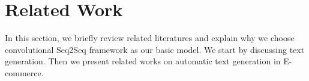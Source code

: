\section{Related Work}
In this section, we briefly review related literatures
and explain why we choose convolutional Seq2Seq framework as our basic model.
We start by discussing text generation.
Then we present related works on automatic text generation in E-commerce.
%
%

